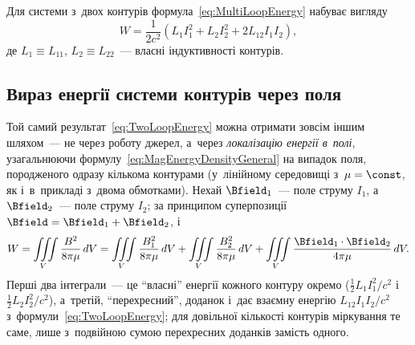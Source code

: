 Для системи з~двох контурів формула~\eqref{eq:MultiLoopEnergy} набуває вигляду
\begin{equation}\label{eq:TwoLoopEnergy}
	W = \frac1{2c^2}\left(L_1I_1^2+L_2I_2^2+2L_{12}I_1I_2\right),
\end{equation}
де $L_1\equiv L_{11}$, $L_2\equiv L_{22}$~--- власні індуктивності контурів.



\subsection*{Вираз енергії системи контурів через поля}



Той самий результат~\eqref{eq:TwoLoopEnergy} можна отримати зовсім іншим шляхом~--- не
через роботу джерел, а~через \emph{локалізацію енергії в~полі}, узагальнюючи
формулу~\eqref{eq:MagEnergyDensityGeneral} на випадок поля, породженого одразу кількома
контурами (у~лінійному середовищі з~$\mu=\const$, як і~в~прикладі з~двома обмотками).
Нехай $\Bfield_1$~--- поле струму $I_1$, а~$\Bfield_2$~--- поле струму $I_2$; за принципом
суперпозиції $\Bfield=\Bfield_1+\Bfield_2$, і
\begin{equation*}
	W=\iiint\limits_V \frac{B^2}{8\pi\mu}\,dV = \iiint\limits_V \frac{B_1^2}{8\pi\mu}\,dV+\iiint\limits_V \frac{B_2^2}{8\pi\mu}\,dV+
	\iiint\limits_V \frac{\Bfield_1\cdot\Bfield_2}{4\pi\mu}\,dV.
\end{equation*}
Перші два інтеграли~--- це \enquote{власні} енергії кожного контуру окремо
($\tfrac12L_1I_1^2/c^2$ і~$\tfrac12L_2I_2^2/c^2$), а~третій, \enquote{перехресний},
доданок і~дає взаємну енергію $L_{12}I_1I_2/c^2$ з~формули~\eqref{eq:TwoLoopEnergy}; для
довільної кількості контурів міркування те саме, лише з~подвійною сумою перехресних
доданків замість одного.

